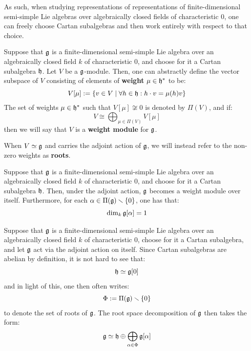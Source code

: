             As such, when studying representations of representations of finite-dimensional semi-simple Lie algebras over algebraically closed fields of characteristic $0$, one can freely choose Cartan subalgebras and then work entirely with respect to that choice. 
            \begin{definition}
                Suppose that $\mathfrak{g}$ is a finite-dimensional semi-simple Lie algebra over an algebraically closed field $k$ of characteristic $0$, and choose for it a Cartan subalgebra $\mathfrak{h}$. Let $V$ be a $\mathfrak{g}$-module. Then, one can abstractly define the vector subspace of $V$ consisting of elements of \textbf{weight} $\mu \in \mathfrak{h}^*$ to be:
                    $$V[\mu] := \{v \in V \mid \forall h \in \mathfrak{h}: h \cdot v = \mu(h) v\}$$
                The set of weights $\mu \in \mathfrak{h}^*$ such that $V[\mu] \not \cong 0$ is denoted by $\Pi(V)$, and if:
                    $$V \cong \bigoplus_{\mu \in \Pi(V)} V[\mu]$$
                then we will say that $V$ is a \textbf{weight module} for $\mathfrak{g}$. 

                When $V \simeq \mathfrak{g}$ and carries the adjoint action of $\mathfrak{g}$, we will instead refer to the non-zero weights as \textbf{roots}.
            \end{definition}
            \begin{theorem} \label{theorem: root_space_decomposition_for_finite_dimensional_semi_simple_lie_algebras}
                Suppose that $\mathfrak{g}$ is a finite-dimensional semi-simple Lie algebra over an algebraically closed field $k$ of characteristic $0$, and choose for it a Cartan subalgebra $\mathfrak{h}$. Then, under the adjoint action, $\mathfrak{g}$ becomes a weight module over itself. Furthermore, for each $\alpha \in \Pi(\mathfrak{g}) \smallsetminus \{0\}$, one has that:
                    $$\dim_k \mathfrak{g}[\alpha] = 1$$
            \end{theorem}
            \begin{convention}
                Suppose that $\mathfrak{g}$ is a finite-dimensional semi-simple Lie algebra over an algebraically closed field $k$ of characteristic $0$, choose for it a Cartan subalgebra, and let $\mathfrak{g}$ act via the adjoint action on itself. Since Cartan subalgebras are abelian by definition, it is not hard to see that:
                    $$\mathfrak{h} \simeq \mathfrak{g}[0]$$
                and in light of this, one then often writes:
                    $$\Phi := \Pi(\mathfrak{g}) \smallsetminus \{0\}$$
                to denote the set of roots of $\mathfrak{g}$. The root space decomposition of $\mathfrak{g}$ then takes the form:
                    $$\mathfrak{g} \simeq \mathfrak{h} \oplus \bigoplus_{\alpha \in \Phi} \mathfrak{g}[\alpha]$$
            \end{convention}
